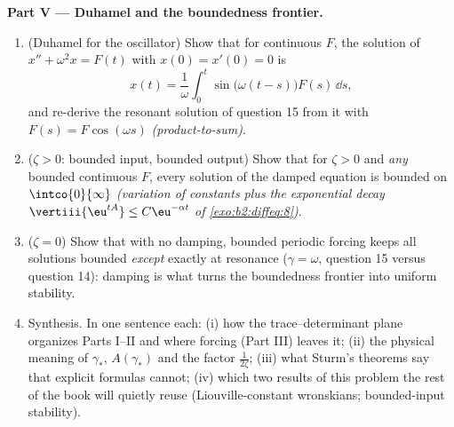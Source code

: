 \begin{problem}
\medskip
\noindent\textbf{Part V --- Duhamel and the boundedness
frontier.}
\begin{enumerate}[resume]
  \item (Duhamel for the oscillator) Show that for
        continuous $F$, the solution of $x'' + \omega^2x =
        F(t)$ with $x(0) = x'(0) = 0$ is
        \[
        x(t) = \frac1\omega\int_0^t\sin\bigl(\omega(t -
        s)\bigr)F(s)\,\dd s ,
        \]
        and re-derive the resonant solution of question 15
        from it with $F(s) = F\cos(\omega s)$
        \emph{(product-to-sum)}.
  \item ($\zeta > 0$: bounded input, bounded output) Show
        that for $\zeta > 0$ and \emph{any} bounded continuous
        $F$, every solution of the damped equation is bounded
        on $\intco{0}{\infty}$ \emph{(variation of constants
        plus the exponential decay $\vertiii{\eu^{tA}} \leq
        C\eu^{-\alpha t}$ of \cref{exo:b2:diffeq:8})}.
  \item ($\zeta = 0$) Show that with no damping, bounded
        periodic forcing keeps all solutions bounded
        \emph{except} exactly at resonance ($\gamma =
        \omega$, question 15 versus question 14): damping is
        what turns the boundedness frontier into uniform
        stability.
  \item Synthesis. In one sentence each: (i) how the
        trace--determinant plane organizes Parts I--II and
        where forcing (Part III) leaves it; (ii) the
        physical meaning of $\gamma_*$, $A(\gamma_*)$ and
        the factor $\frac1{2\zeta}$; (iii) what Sturm's
        theorems say that explicit formulas cannot; (iv)
        which two results of this problem the rest of the
        book will quietly reuse (Liouville-constant
        wronskians; bounded-input stability).
\end{enumerate}
\end{problem}
